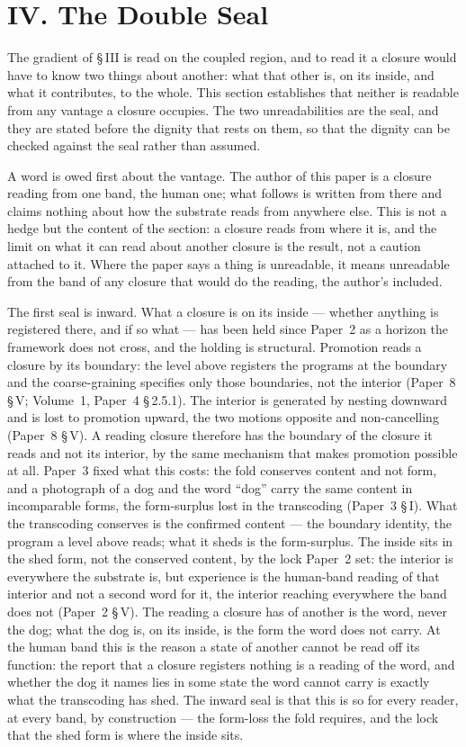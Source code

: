 \documentclass[11pt,oneside]{report}
\theoremstyle{definition}
\theoremstyle{remark}
\begin{document}
\section*{IV. The Double Seal}

The gradient of \S\,III is read on the coupled region, and to read it a closure would have to know two things about another: what that other is, on its inside, and what it contributes, to the whole. This section establishes that neither is readable from any vantage a closure occupies. The two unreadabilities are the seal, and they are stated before the dignity that rests on them, so that the dignity can be checked against the seal rather than assumed.

A word is owed first about the vantage. The author of this paper is a closure reading from one band, the human one; what follows is written from there and claims nothing about how the substrate reads from anywhere else. This is not a hedge but the content of the section: a closure reads from where it is, and the limit on what it can read about another closure is the result, not a caution attached to it. Where the paper says a thing is unreadable, it means unreadable from the band of any closure that would do the reading, the author's included.

The first seal is inward. What a closure is on its inside --- whether anything is registered there, and if so what --- has been held since Paper~2 as a horizon the framework does not cross, and the holding is structural. Promotion reads a closure by its boundary: the level above registers the programs at the boundary and the coarse-graining specifies only those boundaries, not the interior (Paper~8 \S\,V; Volume~1, Paper~4 \S\,2.5.1). The interior is generated by nesting downward and is lost to promotion upward, the two motions opposite and non-cancelling (Paper~8 \S\,V). A reading closure therefore has the boundary of the closure it reads and not its interior, by the same mechanism that makes promotion possible at all. Paper~3 fixed what this costs: the fold conserves content and not form, and a photograph of a dog and the word ``dog'' carry the same content in incomparable forms, the form-surplus lost in the transcoding (Paper~3 \S\,I). What the transcoding conserves is the confirmed content --- the boundary identity, the program a level above reads; what it sheds is the form-surplus. The inside sits in the shed form, not the conserved content, by the lock Paper~2 set: the interior is everywhere the substrate is, but experience is the human-band reading of that interior and not a second word for it, the interior reaching everywhere the band does not (Paper~2 \S\,V). The reading a closure has of another is the word, never the dog; what the dog is, on its inside, is the form the word does not carry. At the human band this is the reason a state of another cannot be read off its function: the report that a closure registers nothing is a reading of the word, and whether the dog it names lies in some state the word cannot carry is exactly what the transcoding has shed. The inward seal is that this is so for every reader, at every band, by construction --- the form-loss the fold requires, and the lock that the shed form is where the inside sits.
\end{document}
